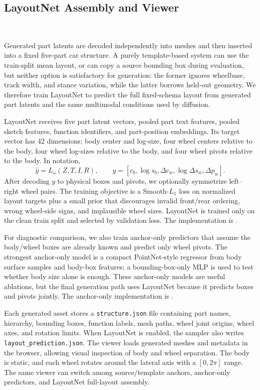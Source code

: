 \documentclass[10pt]{article}
\begin{document}
\subsection{LayoutNet Assembly and Viewer}

\ 

Generated part latents are decoded independently into meshes and then inserted into a fixed five-part car structure. A purely template-based system can use the train-split mean layout, or can copy a source bounding box during evaluation, but neither option is satisfactory for generation: the former ignores wheelbase, track width, and stance variation, while the latter borrows held-out geometry. We therefore train LayoutNet to predict the full fixed-schema layout from generated part latents and the same multimodal conditions used by diffusion.

LayoutNet receives five part latent vectors, pooled part text features, pooled sketch features, function identifiers, and part-position embeddings. Its target vector has 42 dimensions: body center and log-size, four wheel centers relative to the body, four wheel log-sizes relative to the body, and four wheel pivots relative to the body. In notation,
\begin{equation}
    \hat{y}=L_{\omega}(Z,T,I,R), \qquad
    y=[c_b,\log s_b,\Delta c_w,\log \Delta s_w,\Delta p_w].
\end{equation}
After decoding $y$ to physical boxes and pivots, we optionally symmetrize left--right wheel pairs. The training objective is a Smooth-$L_1$ loss on normalized layout targets plus a small prior that discourages invalid front/rear ordering, wrong wheel-side signs, and implausible wheel sizes. LayoutNet is trained only on the clean train split and selected by validation loss. The implementation is .

For diagnostic comparison, we also train anchor-only predictors that assume the body/wheel boxes are already known and predict only wheel pivots. The strongest anchor-only model is a compact PointNet-style regressor from body surface samples and body-box features; a bounding-box-only MLP is used to test whether body size alone is enough. These anchor-only models are useful ablations, but the final generation path uses LayoutNet because it predicts boxes and pivots jointly. The anchor-only implementation is .

Each generated asset stores a \texttt{structure.json} file containing part names, hierarchy, bounding boxes, function labels, mesh paths, wheel joint origins, wheel axes, and rotation limits. When LayoutNet is enabled, the sampler also writes \texttt{layout\_prediction.json}. The viewer loads generated meshes and metadata in the browser, allowing visual inspection of body and wheel separation. The body is static, and each wheel rotates around the lateral axis with a $[0,2\pi]$ range. The same viewer can switch among source/template anchors, anchor-only predictors, and LayoutNet full-layout assembly.
\end{document}
